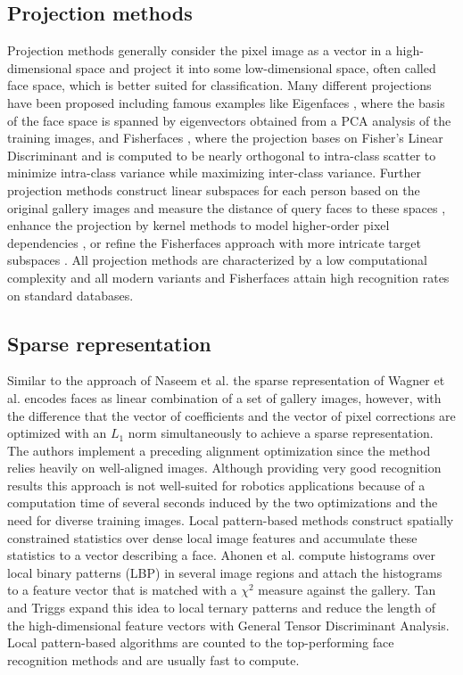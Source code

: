 \subsection{Projection methods}
\label{chap:relwork:sec:recognition:subsec:projection}
Projection methods generally consider the pixel image as a vector in a high-dimensional space and project it into some low-dimensional space, often called face space, which is better suited for classification.
Many different projections have been proposed including famous examples like Eigenfaces \cite{Turk1991}, where the basis of the face space is spanned by eigenvectors obtained from a PCA analysis of the training images, and Fisherfaces \cite{Belhumeur1997}, where the projection bases on Fisher's Linear Discriminant and is computed to be nearly orthogonal to intra-class scatter to minimize intra-class variance while maximizing inter-class variance.
Further projection methods construct linear subspaces for each person based on the original gallery images and measure the distance of query faces to these spaces \cite{Naseem2010}, enhance the projection by kernel methods to model higher-order pixel dependencies \cite{Yang2002}, or refine the Fisherfaces approach with more intricate target subspaces \cite{Yan07, Zhang2010}.
All projection methods are characterized by a low computational complexity and all modern variants and Fisherfaces attain high recognition rates on standard databases.

\subsection{Sparse representation}
\label{chap:relwork:sec:recognition:subsec:sparse}
Similar to the approach of Naseem et al. \cite{Naseem2010} the sparse representation of Wagner et al. \cite{Wagner2012} encodes faces as linear combination of a set of gallery images, however, with the difference that the vector of coefficients and the vector of pixel corrections are optimized with an $L_1$ norm simultaneously to achieve a sparse representation.
The authors implement a preceding alignment optimization since the method relies heavily on well-aligned images.
Although providing very good recognition results this approach is not well-suited for robotics applications because of a computation time of several seconds induced by the two optimizations and the need for diverse training images.
Local pattern-based methods construct spatially constrained statistics over dense local image features and accumulate these statistics to a vector describing a face.
Ahonen et al. \cite{Ahonen2006} compute histograms over local binary patterns (LBP) in several image regions and attach the histograms to a feature vector that is matched with a $\chi^2$ measure against the gallery.
Tan and Triggs \cite{Tan2010} expand this idea to local ternary patterns and reduce the length of the high-dimensional feature vectors with General Tensor Discriminant Analysis.
Local pattern-based algorithms are counted to the top-performing face recognition methods and are usually fast to compute.

